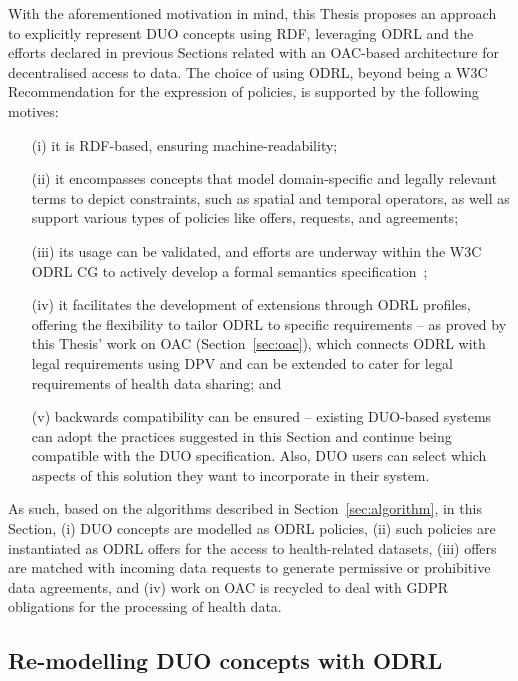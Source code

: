 With the aforementioned motivation in mind, this Thesis proposes an approach to explicitly represent DUO concepts using RDF, leveraging ODRL and the efforts declared in previous Sections related with an OAC-based architecture for decentralised access to data.
The choice of using ODRL, beyond being a W3C Recommendation for the expression of policies, is supported by the following motives:
\begin{enumerate}
    \item[(i)] it is RDF-based, ensuring machine-readability;
    \item[(ii)] it encompasses concepts that model domain-specific and legally relevant terms to depict constraints, such as spatial and temporal operators, as well as support various types of policies like offers, requests, and agreements; %
    \item[(iii)] its usage can be validated, and efforts are underway within the W3C ODRL CG to actively develop a formal semantics specification~\citep{fornara_odrl_2023};
    \item[(iv)] it facilitates the development of extensions through ODRL profiles, offering the flexibility to tailor ODRL to specific requirements -- as proved by this Thesis' work on OAC (Section~\ref{sec:oac}), which connects ODRL with legal requirements using DPV and can be extended to cater for legal requirements of health data sharing; and
    \item[(v)] backwards compatibility can be ensured -- existing DUO-based systems can adopt the practices suggested in this Section and continue being compatible with the DUO specification. Also, DUO users can select which aspects of this solution they want to incorporate in their system.
\end{enumerate}

As such, based on the algorithms described in Section~\ref{sec:algorithm}, in this Section, (i) DUO concepts are modelled as ODRL policies, (ii) such policies are instantiated as ODRL offers for the access to health-related datasets, (iii) offers are matched with incoming data requests to generate permissive or prohibitive data agreements, and (iv) work on OAC is recycled to deal with GDPR obligations for the processing of health data.

\subsection{Re-modelling DUO concepts with ODRL}
\label{sec:poc_duodrl}

